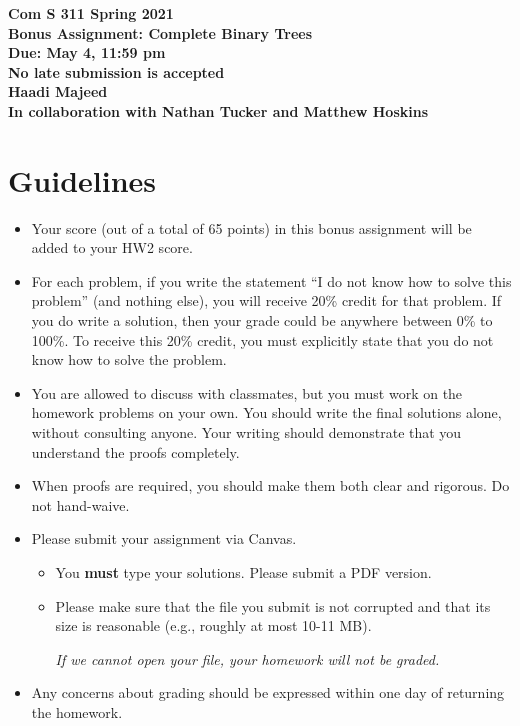\documentclass[12pt]{article}
\begin{document}
\pagestyle{plain}

\begin{center}
{\bf Com S 311 Spring 2021 \\}
{\Large \bf Bonus Assignment: Complete Binary Trees \\}
{\bf Due: May 4, 11:59 pm \\}
{\bf No late submission is accepted \\}
{\bf Haadi Majeed\\In collaboration with Nathan Tucker and Matthew Hoskins\\}
\end{center}

\section*{\large Guidelines}

\begin{itemize}

\item Your score (out of a total of 65 points) in this bonus assignment will be added to your HW2 score.

\item %
For each problem, if you write  the statement ``I do not know how to solve this problem'' (and nothing else), you will receive 20\% credit for that problem. If you do write a solution, then your grade could be anywhere between 0\% to 100\%.
To receive this 20\% credit, you must explicitly state that you do not know how to solve the problem.

\item You are allowed to discuss with classmates, but you must work on the homework problems on your own.  You should write the final solutions alone, without consulting anyone. Your writing should demonstrate that you understand the proofs completely.

\item When proofs are required, you should make them both clear and rigorous. Do not hand-waive.

 \item Please submit your assignment via Canvas.
 \begin{itemize}
\item  You \textbf{must} type your solutions. Please submit a PDF version.
\item Please make sure that the file you submit is not corrupted and that its size is reasonable (e.g., roughly at most 10-11 MB).
\begin{center}
\emph{If we cannot open your file, your homework will not be graded.}
\end{center}
\end{itemize}

\item Any concerns about grading should be expressed within one day of
returning the homework.

\end{itemize}
\end{document}
